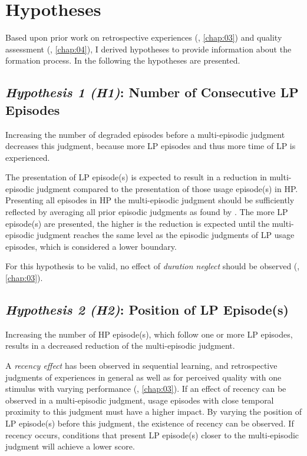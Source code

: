 \section{Hypotheses}
Based upon prior work on retrospective experiences (\cf, \autoref{chap:03}) and quality assessment (\cf, \autoref{chap:04}), I derived \unit[6]{hypotheses} to provide information about the formation process.
In the following the \unit[6]{hypotheses} are presented.

\subsection*{\emph{Hypothesis 1 (H1)}: Number of Consecutive \acl{LP} Episodes}
\begin{hypothesis}[H1]\label{hypo:number}
Increasing the number of degraded episodes before a multi-episodic judgment decreases this judgment, because more \ac{LP} episodes and thus more time of \ac{LP} is experienced.
\end{hypothesis}

The presentation of \ac{LP} episode(s) is expected to result in a reduction in multi-episodic judgment compared to the presentation of those usage episode(s) in \ac{HP}.
Presenting all episodes in \ac{HP} the multi-episodic judgment should be sufficiently reflected by averaging all prior episodic judgments as found by \cite{moller_single-call_2011}.
The more \ac{LP} episode(s) are presented, the higher is the reduction is expected until the multi-episodic judgment reaches the same level as the episodic judgments of \ac{LP} usage episodes, which is considered a lower boundary.

For this hypothesis to be valid, no effect of \emph{duration neglect} should be observed (\cf, \autoref{chap:03}).

\subsection*{\emph{Hypothesis 2 (H2)}: Position of \acl{LP} Episode(s)}
\begin{hypothesis}[H2]\label{hypo:position}
Increasing the number of \ac{HP} episode(s), which follow one or more \ac{LP} episodes, results in a decreased reduction of the multi-episodic judgment.
\end{hypothesis}

A \emph{recency effect} has been observed in sequential learning, and retrospective judgments of experiences in general as well as for perceived quality with one stimulus with varying performance (\cf, \autoref{chap:03}).
If an effect of recency can be observed in a multi-episodic judgment, usage episodes with close temporal proximity to this judgment must have a higher impact.
By varying the position of \ac{LP} episode(s) before this judgment, the existence of recency can be observed.
If recency occurs, conditions that present \ac{LP} episode(s) closer to the multi-episodic judgment will achieve a lower score.

